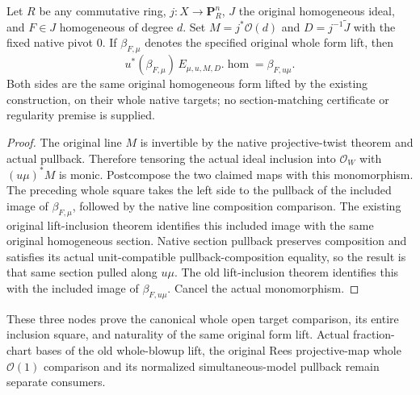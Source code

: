 \begin{theorem}
\label{thm:resume-original-lifted-form-open-naturality}
\leanok
Let $R$ be any commutative ring, $j:X\to\mathbf P_R^n$, $J$ the original
homogeneous ideal, and $F\in J$ homogeneous of degree $d$. Set
$M=j^*\mathcal O(d)$ and $D=j^{-1}\widetilde J$ with the fixed native pivot
$0$. If $\beta_{F,\mu}$ denotes the specified original whole form lift, then
\[
 u^*(\beta_{F,\mu})\,E_{\mu,u,M,D}.\operatorname{hom}
   =\beta_{F,u\mu}.
\]
Both sides are the same original homogeneous form lifted by the existing
construction, on their whole native targets; no section-matching certificate
or regularity premise is supplied.
\end{theorem}
\begin{proof}
The original line $M$ is invertible by the native projective-twist theorem and
actual pullback. Therefore tensoring the actual ideal inclusion into
$\mathcal O_W$ with $(u\mu)^*M$ is monic. Postcompose the two claimed maps with
this monomorphism. The preceding whole square takes the left side to the
pullback of the included image of $\beta_{F,\mu}$, followed by the native line
composition comparison. The existing original lift-inclusion theorem
identifies this included image with the same original homogeneous section.
Native section pullback preserves composition and satisfies its actual
unit-compatible pullback-composition equality, so the result is that same
section pulled along $u\mu$. The old lift-inclusion theorem identifies this
with the included image of $\beta_{F,u\mu}$. Cancel the actual monomorphism.
\end{proof}

These three nodes prove the canonical whole open target comparison, its entire inclusion square, and naturality of the same original form lift. Actual fraction-chart bases of the old whole-blowup lift, the original Rees projective-map whole $\mathcal O(1)$ comparison and its normalized simultaneous-model pullback remain separate consumers.

